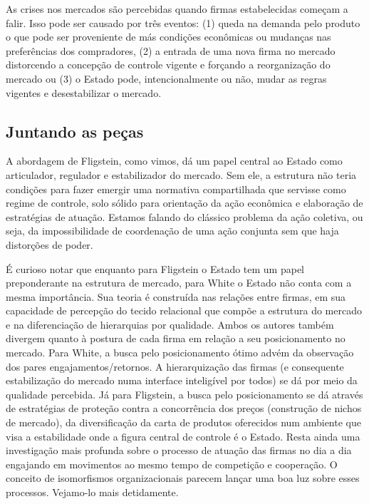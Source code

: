 \documentclass[a4paper, 12pt, openright, oneside, german, french, english, brazil]{abntex2}
\begin{document}
	As crises nos mercados são percebidas quando firmas estabelecidas começam a falir. Isso pode ser causado por três eventos: (1) queda na demanda pelo produto o que pode ser proveniente de más condições econômicas ou mudanças nas preferências dos compradores, (2) a entrada de uma nova firma no mercado distorcendo a concepção de controle vigente e forçando a reorganização do mercado ou (3) o Estado pode, intencionalmente ou não, mudar as regras vigentes e desestabilizar o mercado. 
	
	\subsection{Juntando as peças}
	
	A abordagem de Fligstein, como vimos, dá um papel central ao Estado como articulador, regulador e estabilizador do mercado. Sem ele, a estrutura não teria condições para fazer emergir uma normativa compartilhada que servisse como regime de controle, solo sólido para orientação da ação econômica e elaboração de estratégias de atuação. Estamos falando do clássico problema da ação coletiva, ou seja, da impossibilidade de coordenação de uma ação conjunta sem que haja distorções de poder.
	
	É curioso notar que enquanto para Fligstein o Estado tem um papel preponderante na estrutura de mercado, para White o Estado não conta com a mesma importância. Sua teoria é construída nas relações entre firmas, em sua capacidade de percepção do tecido relacional que compõe a estrutura do mercado e na diferenciação de hierarquias por qualidade. Ambos os autores também divergem quanto à postura de cada firma em relação a seu posicionamento no mercado. Para White, a busca pelo posicionamento ótimo advém da observação dos pares engajamentos/retornos. A hierarquização das firmas (e consequente estabilização do mercado numa interface inteligível por todos) se dá por meio da qualidade percebida. Já para Fligstein, a busca pelo posicionamento se dá através de estratégias de proteção contra a concorrência dos preços (construção de nichos de mercado), da diversificação da carta de produtos oferecidos num ambiente que visa a estabilidade onde a figura central de controle é o Estado. Resta ainda uma investigação mais profunda sobre o processo de atuação das firmas no dia a dia engajando em movimentos ao mesmo tempo de competição e cooperação. O conceito de isomorfismos organizacionais parecem lançar uma boa luz sobre esses processos. Vejamo-lo mais detidamente.
	
\end{document}
